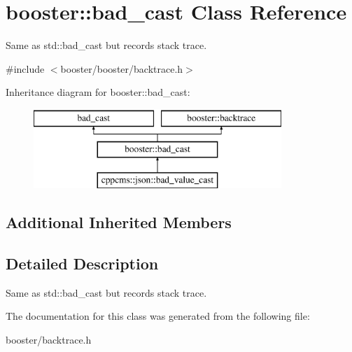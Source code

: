 \section{booster\-:\-:bad\-\_\-cast Class Reference}
\label{classbooster_1_1bad__cast}


Same as std\-::bad\-\_\-cast but records stack trace.  




{\ttfamily \#include $<$booster/booster/backtrace.\-h$>$}

Inheritance diagram for booster\-:\-:bad\-\_\-cast\-:\begin{figure}[H]
\begin{center}
\leavevmode
\includegraphics[height=3.000000cm]{classbooster_1_1bad__cast}
\end{center}
\end{figure}
\subsection*{Additional Inherited Members}


\subsection{Detailed Description}
Same as std\-::bad\-\_\-cast but records stack trace. 

The documentation for this class was generated from the following file\-:\begin{DoxyCompactItemize}
\item 
booster/backtrace.\-h\end{DoxyCompactItemize}
